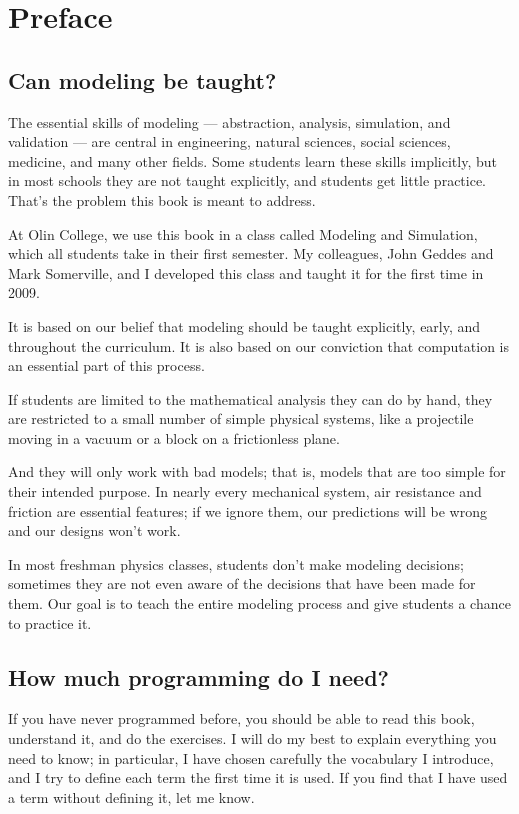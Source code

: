 \documentclass[12pt]{book}
\theoremstyle{exercise}
\begin{document}
\fi

\chapter{Preface}
\label{preface}


\section{Can modeling be taught?}

The essential skills of modeling --- abstraction, analysis, simulation, and validation --- are central in engineering, natural sciences, social sciences, medicine, and many other fields.  Some students learn these skills implicitly, but in most schools they are not taught explicitly, and students get little practice.  That's the problem this book is meant to address.

At Olin College, we use this book in a class called Modeling and Simulation, which all students take in their first semester.  My colleagues, John Geddes and Mark Somerville, and I developed this class and taught it for the first time in 2009.

It is based on our belief that modeling should be taught explicitly, early, and throughout the curriculum.  It is also based on our conviction that computation is an essential part of this process.

If students are limited to the mathematical analysis they can do by hand, they are restricted to a small number of simple physical systems, like a projectile moving in a vacuum or a block on a frictionless plane.

And they will only work with bad models; that is, models that are too simple for their intended purpose.  In nearly every mechanical system, air resistance and friction are essential features; if we ignore them, our predictions will be wrong and our designs won't work.

In most freshman physics classes, students don't make modeling decisions; sometimes they are not even aware of the decisions that have been made for them.  Our goal is to teach the entire modeling process and give students a chance to practice it.


\section{How much programming do I need?}

If you have never programmed before, you should be able to read this book, understand it, and do the exercises.  I will do my best to explain everything you need to know; in particular, I have chosen carefully the vocabulary I introduce, and I try to define each term the first time it is used.  If you find that I have used a term without defining it, let me know.
\end{document}
